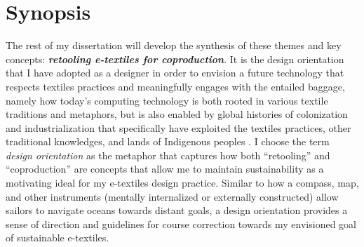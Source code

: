\section{Synopsis}

The rest of my dissertation will develop the synthesis of these themes and key concepts: \textbf{\textit{retooling e-textiles for coproduction}}. It is the design orientation that I have adopted as a designer in order to envision a future technology that respects textiles practices and meaningfully engages with the entailed baggage, namely how today's computing technology is both rooted in various textile traditions and metaphors, but is also enabled by global histories of colonization and industrialization that specifically have exploited the textiles practices, other traditional knowledges, and lands of Indigenous peoples \cite{nakamura_indigenous_2014}. I choose the term \textit{design orientation} as the metaphor that captures how both ``retooling'' and ``coproduction'' are concepts that allow me to maintain sustainability as a motivating ideal for my e-textiles design practice. Similar to how a compass, map, and other instruments (mentally internalized or externally constructed) allow sailors to navigate oceans towards distant goals, a design orientation provides a sense of direction and guidelines for course correction towards my envisioned goal of sustainable e-textiles. 

